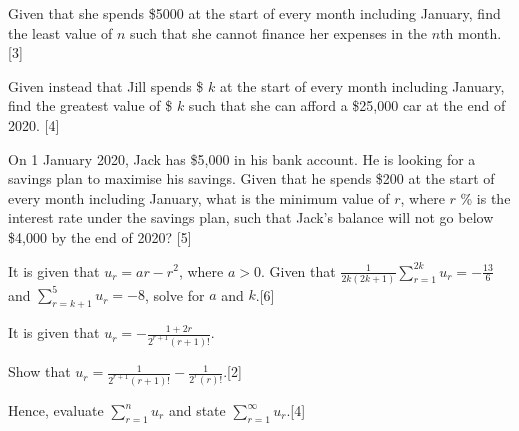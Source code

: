 \documentclass[12pt, a4 paper]{article}
\begin{document}
\begin{outline}[enumerate]
 \2 Given that she spends \$5000 at the start of every month including January, find the least value of \(n\) such that she cannot finance her expenses in the \(n\)th month.\hfill[3]

 \2 Given instead that Jill spends \$ \(k\) at the start of every month including January, find the greatest value of \$ \(k\) such that she can afford a \$25,000 car at the end of 2020. \hfill[4]

 \1 On 1 January 2020, Jack has \$5,000 in his bank account. He is looking for a savings plan to maximise his savings. Given that he spends \$200 at the start of every month including January, what is the minimum value of \(r\), where \(r\) \% is the interest rate under the savings plan, such that Jack's balance will not go below \$4,000 by the end of 2020? \hfill[5] %

 \1 It is given that \(u_{r}=ar-r^2\), where \(a>0\). Given that \(\frac{1}{2k(2k+1)}\sum\limits_{r=1}^{2k}u_{r}=-\frac{13}{6}\) and \(\sum\limits_{r=k+1}^{5}u_{r}=-8\), solve for $a$ and $k$.\hfill[6] %

 \1 It is given that \(u_{r}=-\frac{1+2r}{2^{r+1}(r+1)!}\). %

 \2 Show that \(u_{r}=\frac{1}{2^{r+1}(r+1)!}-\frac{1}{2^{r}(r)!}\).\hfill[2]

 \2 Hence, evaluate \(\sum\limits_{r=1}^{n}u_r\) and state \(\sum\limits_{r=1}^{\infty}u_r\).\hfill[4]


 \1 %

 \1 %

\end{outline}
\end{document}
